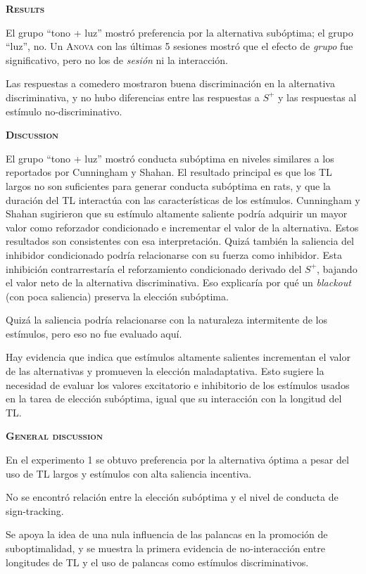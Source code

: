 \documentclass[a4paper,12pt]{article}
\begin{document}
 {\scshape\bfseries Results}
 
El grupo ``tono + luz'' mostró preferencia por la alternativa subóptima; el grupo ``luz'', no. Un {\scshape Anova} con las últimas 5 sesiones mostró que el efecto de {\itshape grupo} fue significativo, pero no los de {\itshape sesión} ni la interacción.

Las respuestas a comedero mostraron buena discriminación en la alternativa discriminativa, y no hubo diferencias entre las respuestas a $S^{+}$ y las respuestas al estímulo no-discriminativo.

{\scshape\bfseries Discussion}

El grupo ``tono + luz'' mostró conducta subóptima en niveles similares a los reportados por Cunningham y Shahan. El resultado principal es que los TL largos no son suficientes para generar conducta subóptima en rats, y que la duración del TL interactúa con las características de los estímulos. Cunningham y Shahan sugirieron que su estímulo altamente saliente podría adquirir un mayor valor como reforzador condicionado e incrementar el valor de la alternativa. Estos resultados son consistentes con esa interpretación. Quizá también la saliencia del inhibidor condicionado podría relacionarse con su fuerza como inhibidor. Esta inhibición contrarrestaría el reforzamiento condicionado derivado del $S^{+}$, bajando el valor neto de la alternativa discriminativa. Eso explicaría por qué un {\itshape blackout} (con poca saliencia) preserva la elección subóptima.

Quizá la saliencia podría relacionarse con la naturaleza intermitente de los estímulos, pero eso no fue evaluado aquí.

Hay evidencia que indica que estímulos altamente salientes incrementan el valor de las alternativas y promueven la elección maladaptativa. Esto sugiere la necesidad de evaluar los valores excitatorio e inhibitorio de los estímulos usados en la tarea de elección subóptima, igual que su interacción con la longitud del TL. 

{\scshape\bfseries General discussion}

En el experimento 1 se obtuvo preferencia por la alternativa óptima a pesar del uso de TL largos y estímulos con alta saliencia incentiva.

No se encontró relación entre la elección subóptima y el nivel de conducta de sign-tracking.

Se apoya la idea de una nula influencia de las palancas en la promoción de suboptimalidad, y se muestra la primera evidencia de no-interacción entre longitudes de TL y el uso de palancas como estímulos discriminativos.
\end{document}
